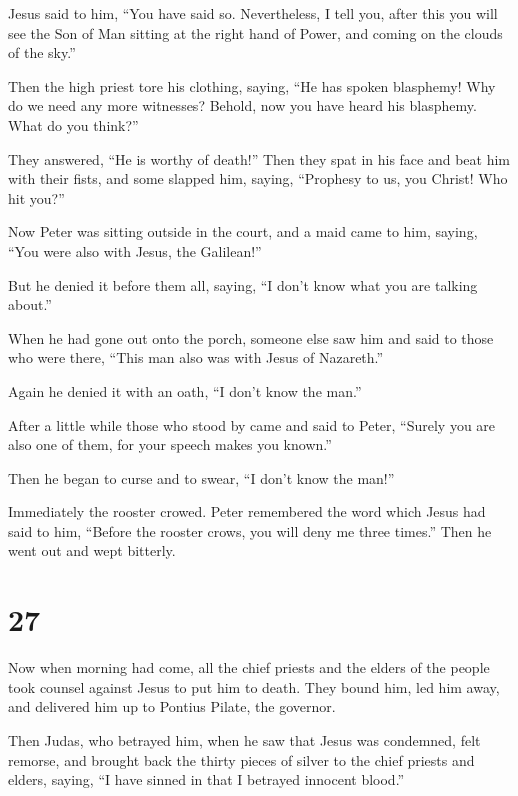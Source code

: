  Jesus said to him, ``You have said so. Nevertheless, I
tell you, after this you will see the Son of Man sitting at the right
hand of Power, and coming on the clouds of the sky.''

 Then the high priest tore his clothing, saying, ``He has
spoken blasphemy! Why do we need any more witnesses? Behold, now you
have heard his blasphemy.  What do you think?''

They answered, ``He is worthy of death!''  Then they spat
in his face and beat him with their fists, and some slapped him,
 saying, ``Prophesy to us, you Christ! Who hit you?''

 Now Peter was sitting outside in the court, and a maid
came to him, saying, ``You were also with Jesus, the Galilean!''

 But he denied it before them all, saying, ``I don't know
what you are talking about.''

 When he had gone out onto the porch, someone else saw
him and said to those who were there, ``This man also was with Jesus of
Nazareth.''

 Again he denied it with an oath, ``I don't know the
man.''

 After a little while those who stood by came and said to
Peter, ``Surely you are also one of them, for your speech makes you
known.''

 Then he began to curse and to swear, ``I don't know the
man!''

Immediately the rooster crowed.  Peter remembered the
word which Jesus had said to him, ``Before the rooster crows, you will
deny me three times.'' Then he went out and wept bitterly.

\hypertarget{section-26}{%
\section{27}\label{section-26}}

 Now when morning had come, all the chief priests and the
elders of the people took counsel against Jesus to put him to death.
 They bound him, led him away, and delivered him up to
Pontius Pilate, the governor.

 Then Judas, who betrayed him, when he saw that Jesus was
condemned, felt remorse, and brought back the thirty pieces of silver to
the chief priests and elders,  saying, ``I have sinned in
that I betrayed innocent blood.''

